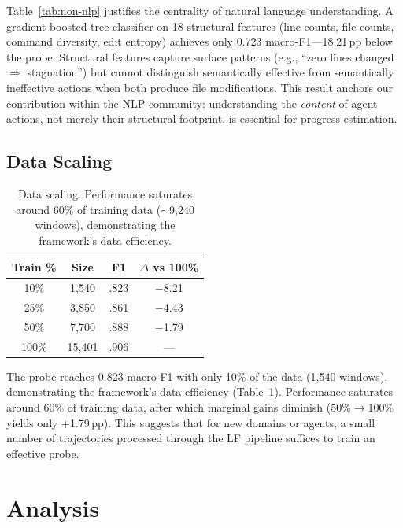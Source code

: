 \documentclass[11pt,a4paper]{article}
\begin{document}
Table~\ref{tab:non-nlp} justifies the centrality of natural language understanding.
A gradient-boosted tree classifier on 18 structural features (line counts, file counts, command diversity, edit entropy) achieves only 0.723 macro-F1---18.21\,pp below the probe.
Structural features capture surface patterns (e.g., ``zero lines changed $\Rightarrow$ stagnation'') but cannot distinguish semantically effective from semantically ineffective actions when both produce file modifications.
This result anchors our contribution within the NLP community: understanding the \emph{content} of agent actions, not merely their structural footprint, is essential for progress estimation.

\subsection{Data Scaling}

\begin{table}[t]
\centering
\small
\begin{tabular}{cccc}
\toprule
\textbf{Train \%} & \textbf{Size} & \textbf{F1} & \textbf{$\Delta$ vs 100\%} \\
\midrule
10\% & 1,540 & .823 & $-$8.21 \\
25\% & 3,850 & .861 & $-$4.43 \\
50\% & 7,700 & .888 & $-$1.79 \\
100\% & 15,401 & .906 & --- \\
\bottomrule
\end{tabular}
\caption{Data scaling. Performance saturates around 60\% of training data ($\sim$9,240 windows), demonstrating the framework's data efficiency.}
\label{tab:scaling}
\end{table}

The probe reaches 0.823 macro-F1 with only 10\% of the data (1,540 windows), demonstrating the framework's data efficiency (Table~\ref{tab:scaling}).
Performance saturates around 60\% of training data, after which marginal gains diminish (50\%$\to$100\% yields only +1.79\,pp).
This suggests that for new domains or agents, a small number of trajectories processed through the LF pipeline suffices to train an effective probe.

\section{Analysis}
\end{document}
